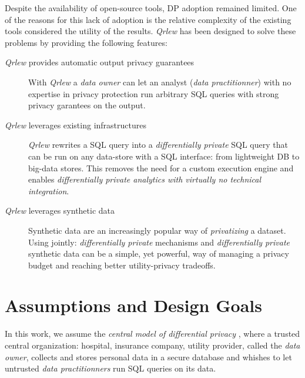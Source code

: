 \documentclass[letterpaper]{article} %
\newcommand{\qrlew}{\emph{Qrlew}}
\begin{document}
Despite the availability of open-source tools, DP adoption remained limited.
One of the reasons for this lack of adoption is the relative complexity of the existing tools considered the utility of the results.
\qrlew{} \cite{Grislain_Qrlew_2023} has been designed to solve these problems by providing the following features:
\begin{description}
    \item[\qrlew{} provides automatic output privacy guarantees]
    With \qrlew{} a \emph{data owner} can let an analyst (\emph{data practitionner}) with no expertise in privacy protection run arbitrary SQL queries with strong privacy garantees on the output.
    \item[\qrlew{} leverages existing infrastructures]
    \qrlew{} rewrites a SQL query into a \emph{differentially private} SQL query that can be run on any data-store with a SQL interface: from lightweight DB to big-data stores.
This removes the need for a custom execution engine and enables \emph{differentially private analytics with virtually no technical integration}.
    \item[\qrlew{} leverages synthetic data]
    Synthetic data are an increasingly popular way of \emph{privatizing} a dataset. Using jointly: \emph{differentially private} mechanisms and \emph{differentially private} synthetic data can be a simple, yet powerful, way of managing a privacy budget and reaching better utility-privacy tradeoffs.
\end{description}



\section{Assumptions and Design Goals}

In this work, we assume the \emph{central model of differential privacy} \cite{near2020threat}, where a trusted central organization: hospital, insurance company, utility provider, called the \emph{data owner}, collects and stores personal data in a secure database and whishes to let untrusted \emph{data practitionners} run SQL queries on its data.
\end{document}

